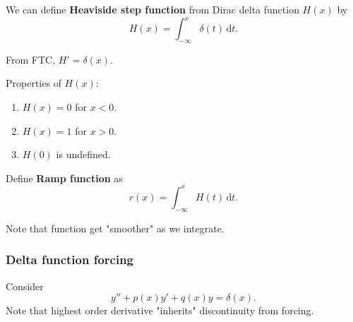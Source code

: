 \documentclass[a4paper]{article}
\begin{document}
      \begin{definition}
        We can define \textbf{Heaviside step function} from Dirac delta function $H(x)$ by 
        \begin{equation}\label{eq:heaviside step func}
            H(x)=\int_{-\infty}^{x} \delta(t) \,\mathrm{d}t.
        \end{equation}
      \end{definition}
      From FTC, $ H'=\delta(x) $.

      Properties of $H(x)$:
      \begin{enumerate}
          \item $H(x)=0$ for $x<0$.
          \item $H(x)=1$ for $x>0$.
          \item $ H(0) $ is undefined.
      \end{enumerate}
      \begin{center}
      \end{center}
      \begin{definition}
          Define \textbf{Ramp function} as 
          \[
              r(x)=\int_{-\infty}^{x} H(t) \,\mathrm{d}t
          .\]
      \end{definition}      \begin{center}
      \end{center}
      Note that function get "smoother" as we integrate.
      \subsubsection{Delta function forcing}
      Consider
      \begin{equation}\label{eq:16.5}
        y''+p(x)y'+q(x)y=\delta(x).
      \end{equation}
      Note that highest order derivative "inherits" discontinuity from forcing.
\end{document}
